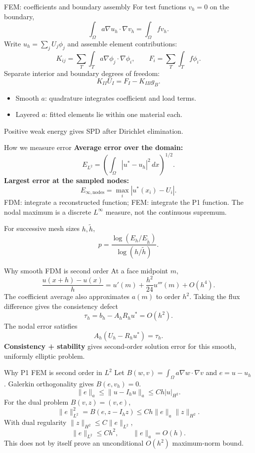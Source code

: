 \documentclass{beamer}
\begin{document}
\begin{frame}{FEM: coefficients and boundary assembly}
For test functions $v_h=0$ on the boundary,
\[\int_\Omega a\nabla u_h\cdot\nabla v_h=\int_\Omega fv_h.\]
Write $u_h=\sum_j U_j\phi_j$ and assemble element contributions:
\[K_{ij}=\sum_T\int_T a\nabla\phi_j\cdot\nabla\phi_i,
\qquad F_i=\sum_T\int_T f\phi_i.\]
Separate interior and boundary degrees of freedom:
\[K_{II}U_I=F_I-K_{IB}g_B.\]
\begin{itemize}
\item Smooth $a$: quadrature integrates coefficient and load terms.
\item Layered $a$: fitted elements lie within one material each.
\end{itemize}
\small Positive weak energy gives SPD after Dirichlet elimination.
\end{frame}

\begin{frame}{How we measure error}
\textbf{Average error over the domain:}
\[E_{L^2}=\left(\int_\Omega|u^*-u_h|^2\,dx\right)^{1/2}.\]
\textbf{Largest error at the sampled nodes:}
\[E_{\infty,\mathrm{nodes}}=\max_i|u^*(x_i)-U_i|.\]
FDM: integrate a reconstructed function; FEM: integrate the P1 function.
The nodal maximum is a discrete $L^\infty$ measure, not the continuous supremum.
\medskip

For successive mesh sizes $h,\widetilde h$,
\[p=\frac{\log(E_h/E_{\widetilde h})}{\log(h/\widetilde h)}.\]
\end{frame}

\begin{frame}{Why smooth FDM is second order}
At a face midpoint $m$,
\[\frac{u(x+h)-u(x)}h=u'(m)+\frac{h^2}{24}u'''(m)+O(h^4).\]
The coefficient average also approximates $a(m)$ to order $h^2$.
Taking the flux difference gives the consistency defect
\[\tau_h=b_h-A_hR_hu^*=O(h^2).\]
The nodal error satisfies
\[A_h(U_h-R_hu^*)=\tau_h.\]
\textbf{Consistency + stability} gives second-order solution error for this smooth, uniformly elliptic problem.
\end{frame}

\begin{frame}{Why P1 FEM is second order in $L^2$}
Let $B(w,v)=\int_\Omega a\nabla w\cdot\nabla v$ and $e=u-u_h$.
Galerkin orthogonality gives $B(e,v_h)=0$.
\[\|e\|_a\leq\|u-I_hu\|_a\leq Ch|u|_{H^2}.\]
For the dual problem $B(v,z)=(v,e)$,
\[\|e\|_{L^2}^2=B(e,z-I_hz)
 \leq Ch\|e\|_a\|z\|_{H^2}.\]
With dual regularity $\|z\|_{H^2}\leq C\|e\|_{L^2}$,
\[\boxed{\|e\|_{L^2}\leq Ch^2},\qquad \|e\|_a=O(h).\]
\small This does not by itself prove an unconditional $O(h^2)$ maximum-norm bound.
\end{frame}
\end{document}
